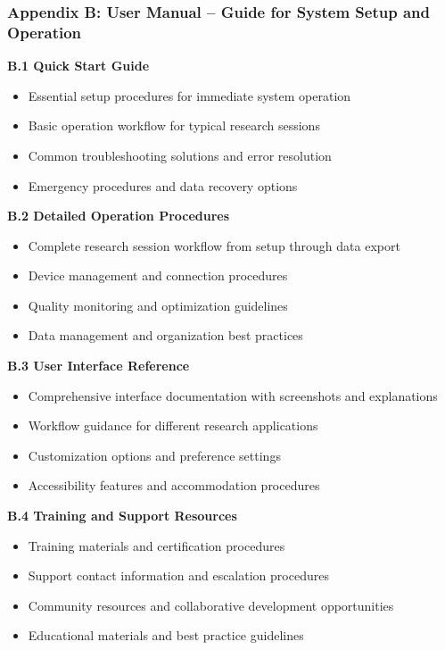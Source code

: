 \documentclass[12pt,a4paper]{report}
\begin{document}
\subsubsection{Appendix B: User Manual – Guide for System Setup and Operation}

\textbf{B.1 Quick Start Guide}

\begin{itemize}
\item Essential setup procedures for immediate system operation
\item Basic operation workflow for typical research sessions
\item Common troubleshooting solutions and error resolution
\item Emergency procedures and data recovery options

\end{itemize}
\textbf{B.2 Detailed Operation Procedures}

\begin{itemize}
\item Complete research session workflow from setup through data export
\item Device management and connection procedures
\item Quality monitoring and optimization guidelines
\item Data management and organization best practices

\end{itemize}
\textbf{B.3 User Interface Reference}

\begin{itemize}
\item Comprehensive interface documentation with screenshots and explanations
\item Workflow guidance for different research applications
\item Customization options and preference settings
\item Accessibility features and accommodation procedures

\end{itemize}
\textbf{B.4 Training and Support Resources}

\begin{itemize}
\item Training materials and certification procedures
\item Support contact information and escalation procedures
\item Community resources and collaborative development opportunities
\item Educational materials and best practice guidelines

\end{itemize}
\end{document}
